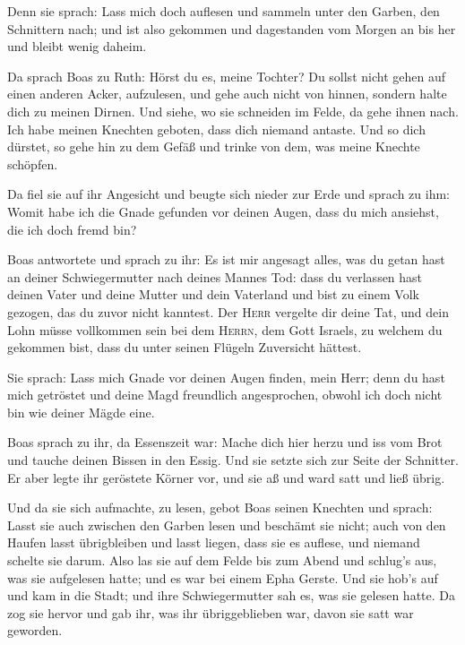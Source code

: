  Denn sie sprach: Lass mich doch auflesen und sammeln
unter den Garben, den Schnittern nach; und ist also gekommen und
dagestanden vom Morgen an bis her und bleibt wenig daheim.

 Da sprach Boas zu Ruth: Hörst du es, meine Tochter? Du
sollst nicht gehen auf einen anderen Acker, aufzulesen, und gehe auch
nicht von hinnen, sondern halte dich zu meinen Dirnen. 
Und siehe, wo sie schneiden im Felde, da gehe ihnen nach. Ich habe
meinen Knechten geboten, dass dich niemand antaste. Und so dich dürstet,
so gehe hin zu dem Gefäß und trinke von dem, was meine Knechte schöpfen.

 Da fiel sie auf ihr Angesicht und beugte sich nieder zur
Erde und sprach zu ihm: Womit habe ich die Gnade gefunden vor deinen
Augen, dass du mich ansiehst, die ich doch fremd bin?

 Boas antwortete und sprach zu ihr: Es ist mir angesagt
alles, was du getan hast an deiner Schwiegermutter nach deines Mannes
Tod: dass du verlassen hast deinen Vater und deine Mutter und dein
Vaterland und bist zu einem Volk gezogen, das du zuvor nicht kanntest.
 Der \textsc{Herr} vergelte dir deine Tat, und dein Lohn
müsse vollkommen sein bei dem \textsc{Herrn}, dem Gott Israels, zu
welchem du gekommen bist, dass du unter seinen Flügeln Zuversicht
hättest.

 Sie sprach: Lass mich Gnade vor deinen Augen finden,
mein Herr; denn du hast mich getröstet und deine Magd freundlich
angesprochen, obwohl ich doch nicht bin wie deiner Mägde eine.

 Boas sprach zu ihr, da Essenszeit war: Mache dich hier
herzu und iss vom Brot und tauche deinen Bissen in den Essig. Und sie
setzte sich zur Seite der Schnitter. Er aber legte ihr geröstete Körner
vor, und sie aß und ward satt und ließ übrig.

 Und da sie sich aufmachte, zu lesen, gebot Boas seinen
Knechten und sprach: Lasst sie auch zwischen den Garben lesen und
beschämt sie nicht;  auch von den Haufen lasst
übrigbleiben und lasst liegen, dass sie es auflese, und niemand schelte
sie darum.  Also las sie auf dem Felde bis zum Abend und
schlug's aus, was sie aufgelesen hatte; und es war bei einem Epha
Gerste.  Und sie hob's auf und kam in die Stadt; und ihre
Schwiegermutter sah es, was sie gelesen hatte. Da zog sie hervor und gab
ihr, was ihr übriggeblieben war, davon sie satt war geworden.

